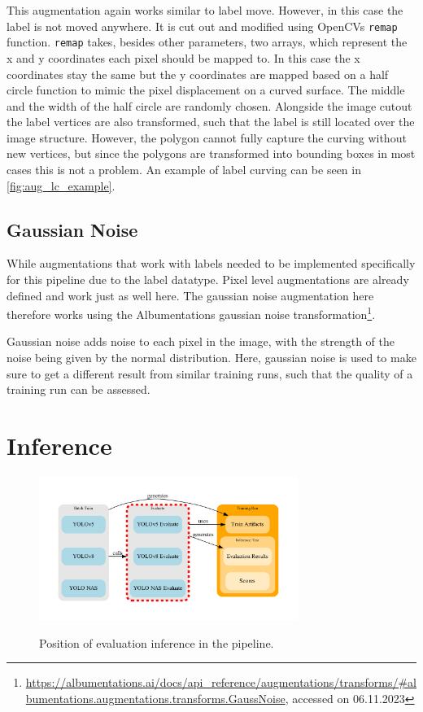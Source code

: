 \documentclass[10pt]{book}
\newcommand{\figureref}[1]{\autoref{#1}}
\begin{document}
This augmentation again works similar to label move. However, in this case the label is not moved anywhere. It is cut out and modified using \acp{OpenCV} \texttt{remap} function. \texttt{remap} takes, besides other parameters, two arrays, which represent the x and y coordinates each pixel should be mapped to. In this case the x coordinates stay the same but the y coordinates are mapped based on a half circle function to mimic the pixel displacement on a curved surface. The middle and the width of the half circle are randomly chosen. Alongside the image cutout the label vertices are also transformed, such that the label is still located over the image structure. However, the polygon cannot fully capture the curving without new vertices, but since the polygons are transformed into bounding boxes in most cases this is not a problem. An example of label curving can be seen in \figureref{fig:aug_lc_example}.

\subsection{Gaussian Noise}

While augmentations that work with labels needed to be implemented specifically for this pipeline due to the label datatype. Pixel level augmentations are already defined and work just as well here. The gaussian noise augmentation here therefore works using the Albumentations gaussian noise transformation\footnote{\url{https://albumentations.ai/docs/api\_reference/augmentations/transforms/\#albumentations.augmentations.transforms.GaussNoise}, accessed on 06.11.2023}. 

Gaussian noise adds noise to each pixel in the image, with the strength of the noise being given by the normal distribution. Here, gaussian noise is used to make sure to get a different result from similar training runs, such that the quality of a training run can be assessed.


\section{Inference}

\begin{figure}
  \caption{Position of evaluation inference in the pipeline.}
  \includegraphics[width=0.75\textwidth]{graph/arch_train_eval_focus}
  \label{fig:arch_train_eval_focus}
\end{figure}
\end{document}
